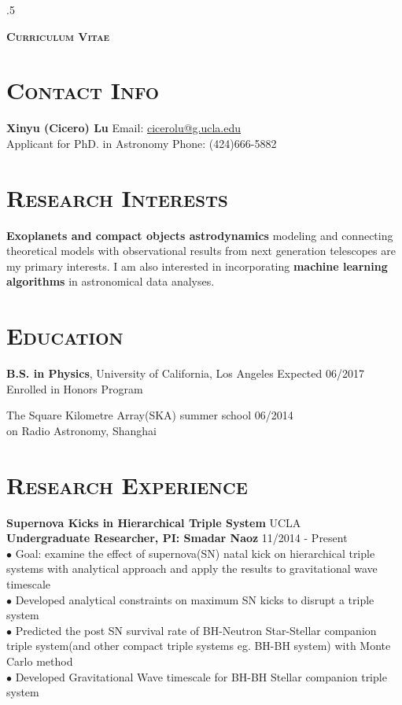 \documentclass[line, margin]{res}
\begin{document}
 \moveleft.5\hoffset\centerline{\LARGE\bf \textsc {Curriculum Vitae}}
 
\begin{resume}
\section{\textsc{Contact Info}}
\textbf{\Large{Xinyu (Cicero) Lu}} \hfill Email: \href{mailto:cicerolu@g.ucla.edu}{cicerolu@g.ucla.edu}\\
	 Applicant for PhD. in Astronomy \hfill {Phone: (424)666-5882}
	 
\section{\textsc{Research Interests}}
\textbf{Exoplanets and compact objects astrodynamics} modeling and connecting theoretical models with observational results from next generation telescopes are my primary interests. I am also interested in incorporating \textbf{machine learning algorithms} in astronomical data analyses. 

\section{\textsc{Education}} 
\textbf{B.S. in Physics}, University of California, Los Angeles \hfill Expected 06/2017\\
Enrolled in Honors Program

The Square Kilometre Array(SKA) summer school  \hfill 06/2014\\
on Radio Astronomy, Shanghai

\section{\textsc{Research Experience} }
\textbf{Supernova Kicks in Hierarchical Triple System } \hfill UCLA \\
\textbf{Undergraduate Researcher,  PI: Smadar Naoz }  \hfill 11/2014 - Present\\
$\bullet$ Goal: examine the effect of supernova(SN) natal kick on hierarchical triple systems with analytical approach and apply the results to gravitational wave timescale\\
$\bullet$ Developed analytical constraints on maximum SN kicks to disrupt a triple system\\
$\bullet$ Predicted the post SN survival rate of BH-Neutron Star-Stellar companion triple system(and other compact triple systems eg. BH-BH system) with Monte Carlo method\\
$\bullet$ Developed Gravitational Wave timescale for BH-BH Stellar companion triple system


\end{resume}
\end{document}

